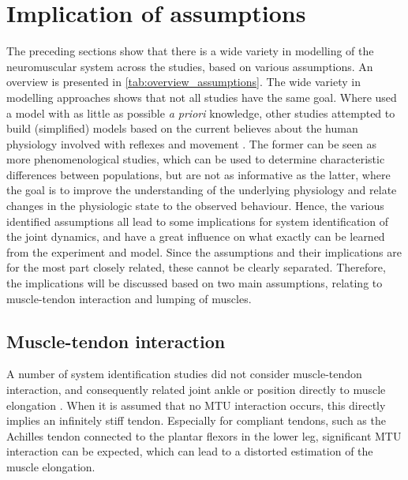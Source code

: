 \section{Implication of assumptions}
The preceding sections show that there is a wide variety in modelling of the neuromuscular system across the studies, based on various assumptions. An overview is presented in \autoref{tab:overview_assumptions}. The wide variety in modelling approaches shows that not all studies have the same goal. Where \cite{kearney_identification_1997, mirbagheri_intrinsic_2000, de_gooijer-van_de_groep_estimation_2016, jalaleddini_subspace_2017} used a model with as little as possible \textit{a priori} knowledge, other studies attempted to build (simplified) models based on the current believes about the human physiology involved with reflexes and movement \cite{zhang_simultaneous_1997, van_der_helm_identification_2002, schouten_nmclab_2008, mugge_rigorous_2010}. The former can be seen as more phenomenological studies, which can be used to determine characteristic differences between populations, but are not as informative as the latter, where the goal is to improve the understanding of the underlying physiology and relate changes in the physiologic state to the observed behaviour. Hence, the various identified assumptions all lead to some implications for system identification of the joint dynamics, and have a great influence on what exactly can be learned from the experiment and model. Since the assumptions and their implications are for the most part closely related, these cannot be clearly separated. Therefore, the implications will be discussed based on two main assumptions, relating to muscle-tendon interaction and lumping of muscles. 


\subsection{Muscle-tendon interaction}
A number of system identification studies did not consider muscle-tendon interaction, and consequently related joint ankle or position directly to muscle elongation \cite{zhang_simultaneous_1997, kearney_identification_1997, mirbagheri_intrinsic_2000, van_der_helm_identification_2002, de_gooijer-van_de_groep_estimation_2016}. When it is assumed that no MTU interaction occurs, this directly implies an infinitely stiff tendon. Especially for compliant tendons, such as the Achilles tendon connected to the plantar flexors in the lower leg, significant MTU interaction can be expected, which can lead to a distorted estimation of the muscle elongation. %

